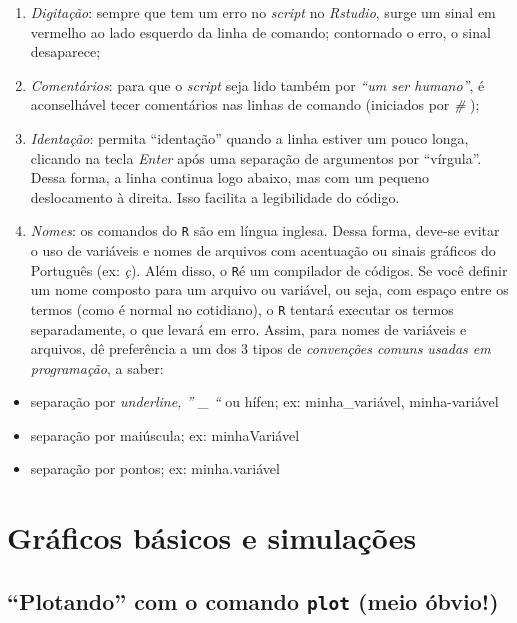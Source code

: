 \documentclass[
  letterpaper,
  DIV=11,
  numbers=noendperiod]{scrreprt}
\providecommand{\tightlist}{%
  \setlength{\itemsep}{0pt}\setlength{\parskip}{0pt}}\usepackage{longtable,booktabs,array}
\begin{document}
\begin{enumerate}
\def\labelenumi{\arabic{enumi}.}
\tightlist
\item
  \emph{Digitação}: sempre que tem um erro no \emph{script} no
  \emph{Rstudio}, surge um sinal em vermelho ao lado esquerdo da linha
  de comando; contornado o erro, o sinal desaparece;
\item
  \emph{Comentários}: para que o \emph{script} seja lido também por
  \emph{``um ser humano''}, é aconselhável tecer comentários nas linhas
  de comando (iniciados por \emph{\#} );
\item
  \emph{Identação}: permita ``identação'' quando a linha estiver um
  pouco longa, clicando na tecla \emph{Enter} após uma separação de
  argumentos por ``vírgula''. Dessa forma, a linha continua logo abaixo,
  mas com um pequeno deslocamento à direita. Isso facilita a
  legibilidade do código.
\item
  \emph{Nomes}: os comandos do \texttt{R} são em língua inglesa. Dessa
  forma, deve-se evitar o uso de variáveis e nomes de arquivos com
  acentuação ou sinais gráficos do Português (ex: \emph{ç}). Além disso,
  o \texttt{R}é um compilador de códigos. Se você definir um nome
  composto para um arquivo ou variável, ou seja, com espaço entre os
  termos (como é normal no cotidiano), o \texttt{R} tentará executar os
  termos separadamente, o que levará em erro. Assim, para nomes de
  variáveis e arquivos, dê preferência a um dos 3 tipos de
  \emph{convenções comuns usadas em programação}, a saber:
\end{enumerate}

\begin{itemize}
\tightlist
\item
  separação por \emph{underline, '' \_ ``} ou hífen; ex:
  minha\_variável, minha-variável
\item
  separação por maiúscula; ex: minhaVariável
\item
  separação por pontos; ex: minha.variável
\end{itemize}


\chapter{Gráficos básicos e
simulações}\label{gruxe1ficos-buxe1sicos-e-simulauxe7uxf5es}

\section{\texorpdfstring{``Plotando'' com o comando \texttt{plot} (meio
óbvio!)}{``Plotando'' com o comando plot (meio óbvio!)}}\label{sec-basico}
\end{document}

